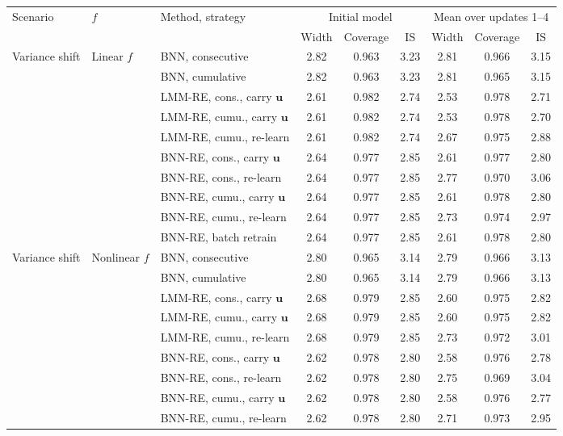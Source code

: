 \begin{tabular}{ll l ccc ccc}
\hline
Scenario & $f$ & Method, strategy & \multicolumn{3}{c}{Initial model} & \multicolumn{3}{c}{Mean over updates 1--4} \\
\cline{4-6}\cline{7-9}
 & & & Width & Coverage & IS & Width & Coverage & IS \\
\hline
Variance shift & Linear $f$ & BNN, consecutive & 2.82 & 0.963 & 3.23 & 2.81 & 0.966 & 3.15 \\
 &  & BNN, cumulative & 2.82 & 0.963 & 3.23 & 2.81 & 0.965 & 3.15 \\
 &  & LMM-RE, cons., carry $\bm u$ & 2.61 & 0.982 & 2.74 & 2.53 & 0.978 & 2.71 \\
 &  & LMM-RE, cumu., carry $\bm u$ & 2.61 & 0.982 & 2.74 & 2.53 & 0.978 & 2.70 \\
 &  & LMM-RE, cumu., re-learn & 2.61 & 0.982 & 2.74 & 2.67 & 0.975 & 2.88 \\
 &  & BNN-RE, cons., carry $\bm u$ & 2.64 & 0.977 & 2.85 & 2.61 & 0.977 & 2.80 \\
 &  & BNN-RE, cons., re-learn & 2.64 & 0.977 & 2.85 & 2.77 & 0.970 & 3.06 \\
 &  & BNN-RE, cumu., carry $\bm u$ & 2.64 & 0.977 & 2.85 & 2.61 & 0.978 & 2.80 \\
 &  & BNN-RE, cumu., re-learn & 2.64 & 0.977 & 2.85 & 2.73 & 0.974 & 2.97 \\
 &  & BNN-RE, batch retrain & 2.64 & 0.977 & 2.85 & 2.61 & 0.978 & 2.80 \\
\hline
Variance shift & Nonlinear $f$ & BNN, consecutive & 2.80 & 0.965 & 3.14 & 2.79 & 0.966 & 3.13 \\
 &  & BNN, cumulative & 2.80 & 0.965 & 3.14 & 2.79 & 0.966 & 3.13 \\
 &  & LMM-RE, cons., carry $\bm u$ & 2.68 & 0.979 & 2.85 & 2.60 & 0.975 & 2.82 \\
 &  & LMM-RE, cumu., carry $\bm u$ & 2.68 & 0.979 & 2.85 & 2.60 & 0.975 & 2.82 \\
 &  & LMM-RE, cumu., re-learn & 2.68 & 0.979 & 2.85 & 2.73 & 0.972 & 3.01 \\
 &  & BNN-RE, cons., carry $\bm u$ & 2.62 & 0.978 & 2.80 & 2.58 & 0.976 & 2.78 \\
 &  & BNN-RE, cons., re-learn & 2.62 & 0.978 & 2.80 & 2.75 & 0.969 & 3.04 \\
 &  & BNN-RE, cumu., carry $\bm u$ & 2.62 & 0.978 & 2.80 & 2.58 & 0.976 & 2.77 \\
 &  & BNN-RE, cumu., re-learn & 2.62 & 0.978 & 2.80 & 2.71 & 0.973 & 2.95 \\

\end{tabular}
